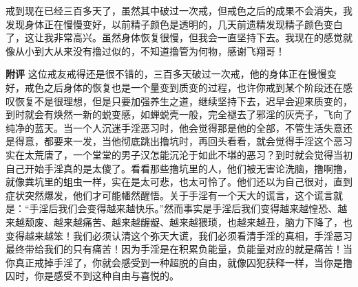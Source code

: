 \begin{case}
    戒到现在已经三百多天了，虽然其中破过一次戒，但戒色之后的成果不会消失，我发现身体正在慢慢变好，以前精子颜色是透明的，几天前遗精发现精子颜色变白了，这让我非常高兴。虽然身体恢复很慢，但我会一直坚持下去。我现在的感觉就像从小到大从来没有撸过似的，不知道撸管为何物，感谢飞翔哥！

    \textbf{附评} 这位戒友戒得还是很不错的，三百多天破过一次戒，他的身体正在慢慢变好，戒色之后身体的恢复也是一个量变到质变的过程，也许你戒到某个阶段还在感叹恢复不是很理想，但是只要加强养生之道，继续坚持下去，迟早会迎来质变的，到时就会有焕然一新的蜕变感，如蝉蜕壳一般，完全褪去了邪淫的灰壳子，飞向了纯净的蓝天。当一个人沉迷手淫恶习时，他会觉得那是他的全部，不管生活失意还是得意，都要来一发，当他彻底跳出撸坑时，再回头看看，就会觉得手淫这个恶习实在太荒唐了，一个堂堂的男子汉怎能沉沦于如此不堪的恶习？到时就会觉得当初自己开始手淫真的是太傻了。看看那些撸坑里的人，他们被无害论洗脑，撸啊撸，就像粪坑里的蛆虫一样，实在是太可悲，也太可怜了。他们还以为自己很对，直到症状突然爆发，他们才可能幡然醒悟。关于手淫有一个天大的谎言，这个谎言就是：“手淫后我们会变得越来越快乐。”然而事实是手淫后我们变得越来越惶恐、越来越颓废、越来越痛苦、越来越龌龊、越来越猥琐，也越来越丑，脑力下降了，也变得越来越笨！我们必须认清这个弥天大谎，我们必须看清手淫的真相，手淫恶习最终带给我们的只有痛苦！因为手淫是在积累负能量，负能量对应的就是痛苦！当你真正戒掉手淫了，你就会感受到一种超脱的自由，就像囚犯获释一样，当你是撸囚时，你是感受不到这种自由与喜悦的。
\end{case}

